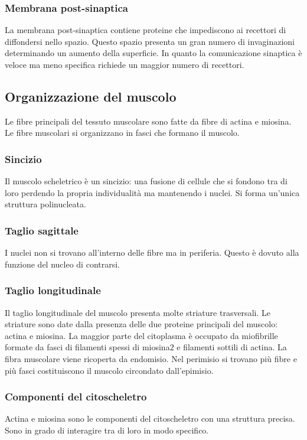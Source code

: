 		\subsubsection{Membrana post-sinaptica}
		La membrana post-sinaptica contiene proteine che impediscono ai recettori di diffondersi nello spazio.
		Questo spazio presenta un gran numero di invaginazioni determinando un aumento della superficie.
		In quanto la comunicazione sinaptica \`e veloce ma meno specifica richiede un maggior numero di recettori.

	\subsection{Organizzazione del muscolo}
	Le fibre principali del tessuto muscolare sono fatte da fibre di actina e miosina.
	Le fibre muscolari si organizzano in fasci che formano il muscolo.
	
		\subsubsection{Sincizio}
		Il muscolo scheletrico \`e un sincizio: una fusione di cellule che si fondono tra di loro perdendo la propria individualit\`a ma mantenendo i nuclei.
		Si forma un'unica struttura polinucleata.

		\subsubsection{Taglio sagittale}
		I nuclei non si trovano all'interno delle fibre ma in periferia.
		Questo \`e dovuto alla funzione del nucleo di contrarsi.

		\subsubsection{Taglio longitudinale}
		Il taglio longitudinale del muscolo presenta molte striature trasversali.
		Le striature sono date dalla presenza delle due proteine principali del muscolo: actina e miosina.
		La maggior parte del citoplasma \`e occupato da miofibrille formate da fasci di filamenti spessi di miosina$2$ e filamenti sottili di actina.
		La fibra muscolare viene ricoperta da endomisio.
		Nel perimisio si trovano pi\`u fibre e pi\`u fasci costituiscono il muscolo circondato dall'epimisio.

		\subsubsection{Componenti del citoscheletro}
		Actina e miosina sono le componenti del citoscheletro con una struttura precisa.
		Sono in grado di interagire tra di loro in modo specifico.

